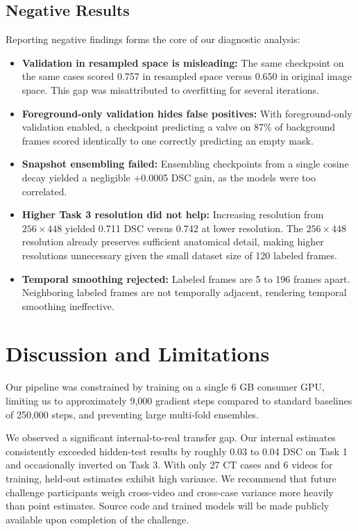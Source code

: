 \documentclass[runningheads]{llncs}
\begin{document}
\subsection{Negative Results}

Reporting negative findings forms the core of our diagnostic analysis:
\begin{itemize}
    \item \textbf{Validation in resampled space is misleading:} The same checkpoint on the same cases scored 0.757 in resampled space versus 0.650 in original image space. This gap was misattributed to overfitting for several iterations.
    \item \textbf{Foreground-only validation hides false positives:} With foreground-only validation enabled, a checkpoint predicting a valve on 87\% of background frames scored identically to one correctly predicting an empty mask.
    \item \textbf{Snapshot ensembling failed:} Ensembling checkpoints from a single cosine decay yielded a negligible +0.0005 DSC gain, as the models were too correlated. 
    \item \textbf{Higher Task 3 resolution did not help:} Increasing resolution from $256 \times 448$ yielded 0.711 DSC versus 0.742 at lower resolution. The $256 \times 448$ resolution already preserves sufficient anatomical detail, making higher resolutions unnecessary given the small dataset size of 120 labeled frames.
    \item \textbf{Temporal smoothing rejected:} Labeled frames are 5 to 196 frames apart. Neighboring labeled frames are not temporally adjacent, rendering temporal smoothing ineffective.
\end{itemize}

\section{Discussion and Limitations}

Our pipeline was constrained by training on a single 6 GB consumer GPU, limiting us to approximately 9,000 gradient steps compared to standard baselines of 250,000 steps, and preventing large multi-fold ensembles. 

We observed a significant internal-to-real transfer gap. Our internal estimates consistently exceeded hidden-test results by roughly 0.03 to 0.04 DSC on Task 1 and occasionally inverted on Task 3. With only 27 CT cases and 6 videos for training, held-out estimates exhibit high variance. We recommend that future challenge participants weigh cross-video and cross-case variance more heavily than point estimates. Source code and trained models will be made publicly available upon completion of the challenge.
\end{document}

